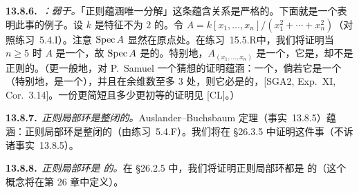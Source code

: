 \textbf{13.8.6.}\ \emph{\trhRemark{}：\trFactoriality{}弱于\trRegularity。}\quad 「正则蕴涵唯一分解」这条蕴含关系是严格的。下面就是一个表明此事的例子。设 $k$ 是特征不为 $2$ 的\trAlgClosedField。令 $A=k[x_1,\dots,x_n]/(x_1^2+\cdots+x_n^2)$（对照\mbox{练习~5.4.I}）。注意 $\operatorname{Spec} A$ 显然在原点处\trSingular。在\mbox{练习~15.5.R}中，我们将证明当 $n\ge5$ 时 $A$ 是一个\trUFD，故 $\operatorname{Spec} A$ 是\trFactorial{}的。特别地，$A_{(x_1,\dots,x_n)}$ 是一个\trNoetherian\trLocalRing，它是\trUFD，却不是正则的。（更一般地，\trGrothendieck{}对 P.~Samuel 一个猜想的证明蕴涵：一个\trNoetherian\trLocalRing，倘若它是一个\trCompleteIntersection（特别地，是一个\trHypersurface），并且在余维数至多 $3$ 处\trFactorial，则它必是\trFactorial{}的，[SGA2, Exp.~XI, Cor.~3.14]。一份更简短且多少更初等的证明见 [CL]。）

\textbf{13.8.7.}\ \emph{正则局部环是整闭的。}\quad Auslander--Buchsbaum 定理（事实~13.8.5）蕴涵：正则局部环是整闭的（由\mbox{练习~5.4.F}）。我们将在 \S26.3.5 中证明这件事（不诉诸事实~13.8.5）。

\textbf{13.8.8.}\ \emph{正则局部环是 \trCM{}的。}\quad 在 \S26.2.5 中，我们将证明正则局部环都是 \trCM{}的（这个概念将在第 26 章中定义）。
